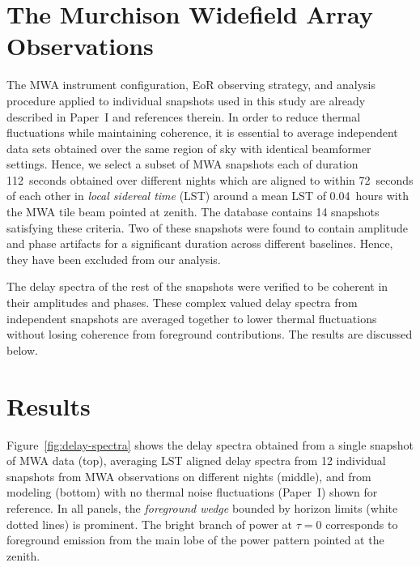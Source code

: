 \documentclass[preprint2,apjl,numberedappendix,twocolappendix,appendixfloats]{emulateapj}
\begin{document}
\section{The Murchison Widefield Array Observations}\label{sec:MWA}

The MWA instrument configuration, EoR observing strategy, and analysis procedure applied to individual snapshots used in this study are already described in Paper~I and references therein. In order to reduce thermal fluctuations while maintaining coherence, it is essential to average independent data sets obtained over the same region of sky with identical beamformer settings. Hence, we select a subset of MWA snapshots each of duration 112~seconds obtained over different nights which are aligned to within 72~seconds of each other in {\it local sidereal time} (LST) around a mean LST of 0.04~hours with the MWA tile beam pointed at zenith. The database contains 14 snapshots satisfying these criteria. Two of these snapshots were found to contain amplitude and phase artifacts for a significant duration across different baselines. Hence, they have been excluded from our analysis. 

The delay spectra of the rest of the snapshots were verified to be coherent in their amplitudes and phases. These complex valued delay spectra from independent snapshots are averaged together to lower thermal fluctuations without losing coherence from foreground contributions. The results are discussed below.

\section{Results}\label{sec:results}

Figure~\ref{fig:delay-spectra} shows the delay spectra obtained from a single snapshot of MWA data (top), averaging LST aligned delay spectra from 12 individual snapshots from MWA observations on different nights (middle), and from modeling (bottom) with no thermal noise fluctuations (Paper~I) shown for reference. In all panels, the {\it foreground wedge} bounded by horizon limits (white dotted lines) is prominent. The bright branch of power at $\tau=0$ corresponds to foreground emission from the main lobe of the power pattern pointed at the zenith. 
\end{document}
